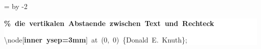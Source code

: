 \begingroup
\ttfamily
{}
=\textwidth
\advance{} by -2\fboxsep
\noindent
\colorbox{background}
{%
\parbox{\dimen255}
{%
\rule[-0.5ex]{0pt}{2.5ex}\hspace*{0.0em}\textcolor{G}{\textbf{\%~die~vertikalen~Abstaende~zwischen~Text~und~Rechteck}}\\
\rule[-0.5ex]{0pt}{2.5ex}\hspace*{0.0em}\textbackslash{}node[\textcolor{R}{\textbf{inner~ysep=3mm}}]~at~(0,~0)~\{Donald~E.~Knuth\};}%
}%
\endgroup
